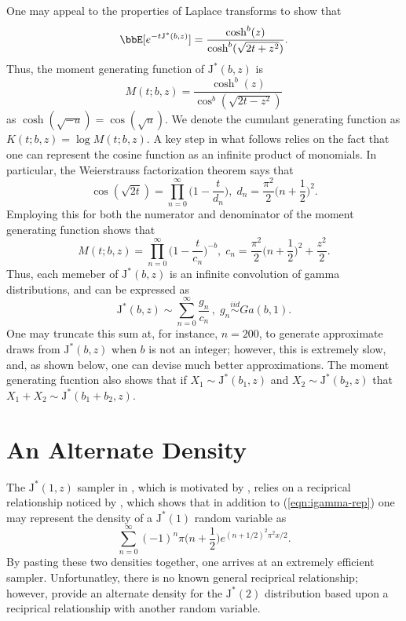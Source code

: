 \documentclass[12pt]{article}
\newcommand{\JJ}{\text{J}^*}
\newcommand{\simiid}{\stackrel{iid}{\sim}}
\begin{document}
One may appeal to the properties of Laplace transforms to show that
\[
\bbE[ e^{-t \JJ(b,z)} ] = \frac{\cosh^b(z)}{\cosh^b(\sqrt{2t + z^2})}.
\]
Thus, the moment generating function of $\JJ(b,z)$ is
\[
M(t; b,z) = \frac{\cosh^b(z)}{\cos^{b}(\sqrt{2t - z^2})}
\]
as $\cosh(\sqrt{-u}) = \cos(\sqrt{u})$.  We denote the cumulant generating
function as $K(t; b,z) = \log M(t; b,z)$.  A key step in what follows relies on
the fact that one can represent the cosine function as an infinite product of
monomials.  In particular, the Weierstrauss factorization theorem says that
\[
\cos(\sqrt{2t}) = \prod_{n=0}^\infty \Big( 1 - \frac{t}{d_n} \Big), \; 
  d_n = \frac{\pi^2}{2} \Big( n + \frac{1}{2} \Big)^2.
\]
Employing this for both the numerator and denominator of the moment generating
function shows that
\[
M(t; b, z) = \prod_{n=0}^\infty \Big( 1 - \frac{t}{c_n} \Big)^{-b}, \; 
  c_n = \frac{\pi^2}{2} \Big( n + \frac{1}{2} \Big)^2 + \frac{z^2}{2}.
\]
Thus, each memeber of $\JJ(b,z)$ is an infinite convolution of gamma
distributions, and can be expressed as
\[
\JJ(b,z) \sim \sum_{n=0}^\infty \frac{g_n}{c_n} \, , \; g_n \simiid Ga(b,1).
\]
One may truncate this sum at, for instance, $n=200$, to generate approximate
draws from $\JJ(b,z)$ when $b$ is not an integer; however, this is extremely
slow, and, as shown below, one can devise much better approximations.  The
moment generating fucntion also shows that if $X_1 \sim \JJ(b_1,z)$ and $X_2
\sim \JJ(b_2, z)$ that $X_1 + X_2 \sim \JJ(b_1 + b_2, z)$.

\section{An Alternate Density}
\label{sec:alternate-density}

The $\JJ(1,z)$ sampler in \cite{polson-etal-2013}, which is motivated by
\cite{devroye-2009}, relies on a reciprical relationship noticed by
\cite{ciesielski-taylor-1962}, which shows that in addition to
(\ref{eqn:igamma-rep}) one may represent the density of a $\JJ(1)$ random
variable as
\[
\sum_{n=0}^\infty (-1)^n \pi \Big(n+\frac{1}{2}\Big) e^{(n+1/2)^2 \pi^2 x / 2}.
\]
By pasting these two densities together, one arrives at an extremely efficient
sampler.  Unfortunatley, there is no known general reciprical relationship;
however, \cite{biane-etal-2001} provide an alternate density for the $\JJ(2)$
distribution based upon a reciprical relationship with another random variable.
\end{document}
